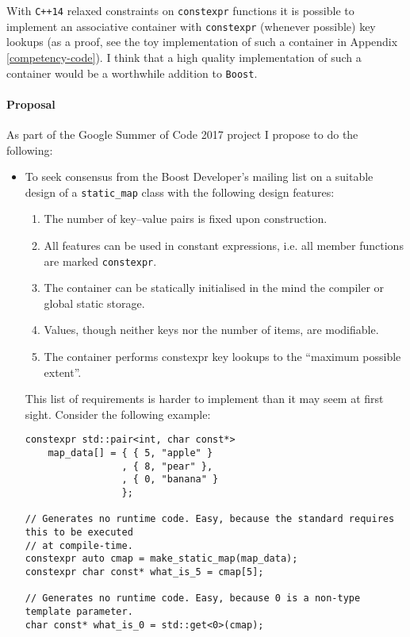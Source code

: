 \documentclass[a4paper,12pt]{article}
\begin{document}
    With \texttt{C++14} relaxed constraints on \texttt{constexpr} functions it is possible to implement an associative container with \texttt{constexpr} (whenever possible) key lookups (as a proof, see the toy implementation of such a container in Appendix \ref{competency-code}). I think that a high quality implementation of such a container would be a worthwhile addition to \texttt{Boost}.



    \paragraph{Proposal} As part of the Google Summer of Code 2017 project I propose to do the following:
    \begin{itemize}
    \item To seek consensus from the Boost Developer's mailing list on a suitable design of a \texttt{static\_map} class with the following design features:
        \begin{enumerate}
        \item The number of key--value pairs is fixed upon construction.
        \item All features can be used in constant expressions, i.e. all member functions are marked \texttt{constexpr}.
        \item The container can be statically initialised in the mind the compiler or global static storage.
        \item Values, though neither keys nor the number of items, are modifiable.
        \item The container performs constexpr key lookups to the ``maximum possible extent''.
        \end{enumerate}

        This list of requirements is harder to implement than it may seem at first sight. Consider the following example:

\begin{spacing}{0.8}
\begin{lstlisting}
constexpr std::pair<int, char const*> 
    map_data[] = { { 5, "apple" }
                 , { 8, "pear" },
                 , { 0, "banana" }
                 };

// Generates no runtime code. Easy, because the standard requires this to be executed 
// at compile-time.
constexpr auto cmap = make_static_map(map_data);
constexpr char const* what_is_5 = cmap[5];

// Generates no runtime code. Easy, because 0 is a non-type template parameter.
char const* what_is_0 = std::get<0>(cmap);


\end{lstlisting}
\end{spacing}
\end{itemize}
\end{document}
